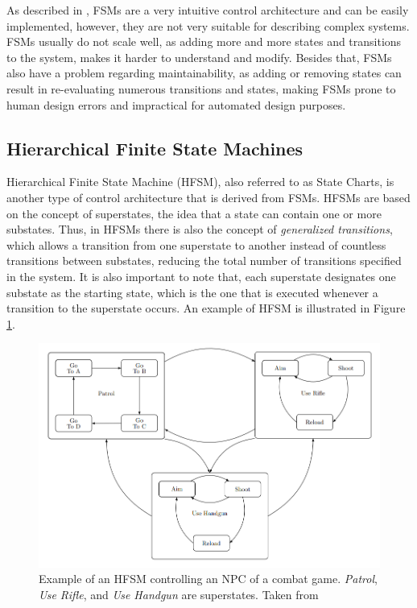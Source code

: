 As described in \cite{BTsInRobotics}, FSMs are a very intuitive control architecture and can be easily implemented, however, they are not very suitable for describing complex systems. FSMs usually do not scale well, as adding more and more states and transitions to the system, makes it harder to understand and modify. Besides that, FSMs also have a problem regarding maintainability, as adding or removing states can result in re-evaluating numerous transitions and states, making FSMs prone to human design errors and impractical for automated design purposes.

\subsection{Hierarchical Finite State Machines}

Hierarchical Finite State Machine (HFSM), also referred to as State Charts, is another type of control architecture that is derived from FSMs. HFSMs are based on the concept of superstates, the idea that a state can contain one or more substates. Thus, in HFSMs there is also the concept of \textit{generalized transitions}, which allows a transition from one superstate to another instead of countless transitions between substates, reducing the total number of transitions specified in the system. It is also important to note that, each superstate designates one substate as the starting state, which is the one that is executed whenever a transition to the superstate occurs. An example of HFSM is illustrated in Figure \ref{fig:hfsm_example}.

\begin{figure}
    \centering
    \includegraphics[width=0.75\linewidth]{chapters/background/images/HFSM Example.png}
    \caption{Example of an HFSM controlling an NPC of a combat game. \textit{Patrol}, \textit{Use Rifle}, and \textit{Use Handgun} are superstates. Taken from \cite{BTsInRobotics}}
    \label{fig:hfsm_example}
\end{figure}


